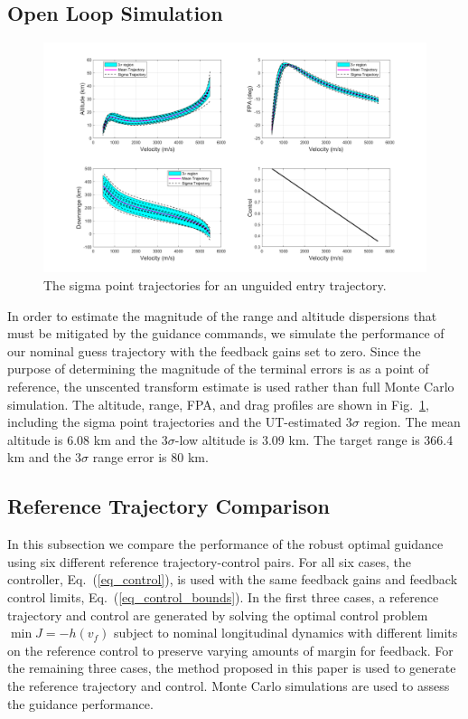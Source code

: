\documentclass[journal ]{new-aiaa}
\begin{document}
\subsection*{Open Loop Simulation}
\begin{figure}[h!]
	\centering
	\includegraphics[width=1\textwidth]{ddp/matlab/HeavyOpenLoopGrid}
	\caption{The sigma point trajectories for an unguided entry trajectory.}
	\label{Fig:OpenLoop}
\end{figure}
In order to estimate the magnitude of the range and altitude dispersions that must be mitigated by the guidance commands, we simulate the performance of our nominal guess trajectory with the feedback gains set to zero. Since the purpose of determining the magnitude of the terminal errors is as a point of reference, the unscented transform estimate is used rather than full Monte Carlo simulation. The altitude, range, FPA, and drag profiles are shown in Fig.~\ref{Fig:OpenLoop}, including the sigma point trajectories and the UT-estimated 3$\sigma$ region. The mean altitude is 6.08 km and the 3$\sigma$-low altitude is 3.09 km. The target range is 366.4 km and the 3$\sigma$ range error is $80$ km. 


\subsection*{Reference Trajectory Comparison}
In this subsection we compare the performance of the robust optimal guidance using six different reference trajectory-control pairs. For all six cases, the controller, Eq.~(\ref{eq_control}), is used with the same feedback gains and feedback control limits, Eq.~(\ref{eq_control_bounds}). In the first three cases, a reference trajectory and control are generated by solving the optimal control problem $\min J = -h(v_f)$ subject to nominal longitudinal dynamics with different limits on the reference control to preserve varying amounts of margin for feedback. For the remaining three cases, the method proposed in this paper is used to generate the reference trajectory and control. Monte Carlo simulations are used to assess the guidance performance.
\end{document}
